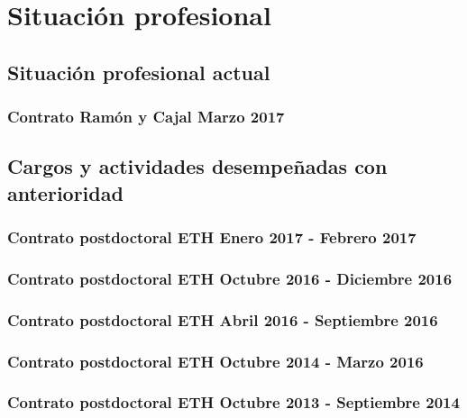 \documentclass[a4paper, 11pt, twoside, openright]{report}
\begin{document}
\chapter{Situación profesional}

\section{Situación profesional actual}

\subsection{Contrato Ramón y Cajal Marzo 2017}



\section{Cargos y actividades desempeñadas con anterioridad}

\subsection{Contrato postdoctoral ETH Enero 2017 - Febrero 2017}

\subsection{Contrato postdoctoral ETH Octubre 2016 - Diciembre 2016}

\subsection{Contrato postdoctoral ETH Abril 2016 - Septiembre 2016}

\subsection{Contrato postdoctoral ETH Octubre 2014 - Marzo 2016}

\subsection{Contrato postdoctoral ETH Octubre 2013 - Septiembre 2014}

\end{document}
